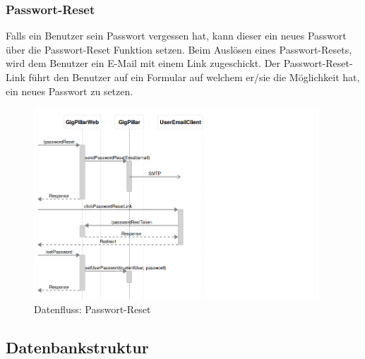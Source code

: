 
\clearpage
\subsubsection{Passwort-Reset}\label{datenfluss-passwort-reset}

Falls ein Benutzer sein Passwort vergessen hat, kann dieser ein neues Passwort
über die Passwort-Reset Funktion setzen. Beim Auslösen eines Passwort-Resets,
wird dem Benutzer ein E-Mail mit einem Link zugeschickt.
Der Passwort-Reset-Link führt den Benutzer auf ein Formular auf welchem er/sie
die Möglichkeit hat, ein neues Passwort zu setzen.

%
%
%

\begin{figure}[!htb]
  \centering
  \includegraphics[width=0.95\textwidth]{konzept/datenfluss-passwort-reset.png}
  \caption{Datenfluss: Passwort-Reset}
\end{figure}

\clearpage
\subsection{Datenbankstruktur}\label{datenbankstruktur}

